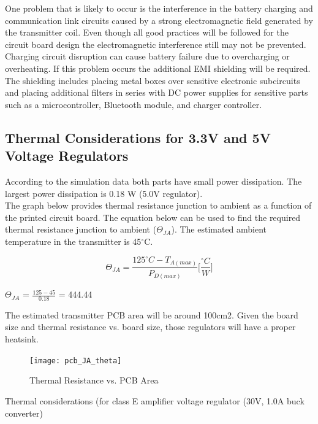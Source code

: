 \documentclass[12pt]{article}
\begin{document}
\pagebreak

\indent
One problem that is likely to occur is the interference in the battery charging and communication link circuits caused by a strong electromagnetic field generated by the transmitter coil. Even though all good practices will be followed for the circuit board design the electromagnetic interference still may not be prevented. Charging circuit disruption can cause battery failure due to overcharging or overheating. If this problem occurs the additional EMI shielding will be required. The shielding includes placing metal boxes over sensitive electronic subcircuits and placing additional filters in series with DC power supplies for sensitive parts such as a microcontroller, Bluetooth module, and charger controller.

\subsection{Thermal Considerations for 3.3V and 5V Voltage Regulators}

\indent \indent
According to the simulation data both parts have small power dissipation. The largest power dissipation is 0.18 W (5.0V regulator).\\

\indent
The graph below provides thermal resistance junction to ambient as a function of the printed circuit board. The equation below can be used to find the required thermal resistance junction to ambient ($\Theta_{JA}$). The estimated ambient temperature in the transmitter is 45$^{\circ}$C.

\begin{equation}
\Theta_{JA} = \frac{125^\circ C - T_{A(max)}}{P_{D(max)}} \Bigg[\frac{^\circ C}{W}\Bigg]
\end{equation}

\noindent
$\Theta_{JA}$ = $\frac{125-45}{0.18}$ = 444.44 

\noindent
The estimated transmitter PCB area will be around 100cm2. Given the board size and thermal resistance vs. board size, those regulators will have a proper heatsink.

\begin{figure}[h!]
\centering
\texttt{[image: pcb\_JA\_theta]}
\caption{Thermal Resistance vs. PCB Area \cite{TPSM265R1}}
\end{figure}

\pagebreak

\noindent
Thermal considerations (for class E amplifier voltage regulator (30V, 1.0A buck converter) 
\end{document}
